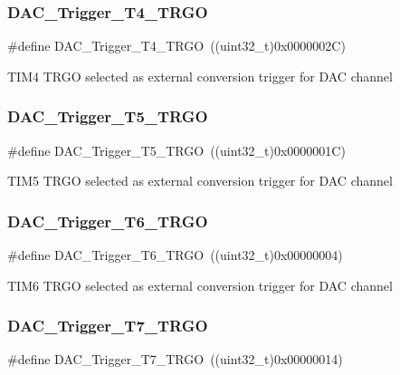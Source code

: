 \subsubsection{\texorpdfstring{DAC\_Trigger\_T4\_TRGO}{DAC\_Trigger\_T4\_TRGO}}
{\footnotesize\ttfamily \#define D\+A\+C\+\_\+\+Trigger\+\_\+\+T4\+\_\+\+T\+R\+GO~((uint32\+\_\+t)0x0000002\+C)}

T\+I\+M4 T\+R\+GO selected as external conversion trigger for D\+AC channel \mbox{\label{group___d_a_c__trigger__selection_ga35352cebfd1ae8a3d63e374a5d86a85d}} 
\subsubsection{\texorpdfstring{DAC\_Trigger\_T5\_TRGO}{DAC\_Trigger\_T5\_TRGO}}
{\footnotesize\ttfamily \#define D\+A\+C\+\_\+\+Trigger\+\_\+\+T5\+\_\+\+T\+R\+GO~((uint32\+\_\+t)0x0000001\+C)}

T\+I\+M5 T\+R\+GO selected as external conversion trigger for D\+AC channel \mbox{\label{group___d_a_c__trigger__selection_ga083307783678a2f1d3066db57dc84cfe}} 
\subsubsection{\texorpdfstring{DAC\_Trigger\_T6\_TRGO}{DAC\_Trigger\_T6\_TRGO}}
{\footnotesize\ttfamily \#define D\+A\+C\+\_\+\+Trigger\+\_\+\+T6\+\_\+\+T\+R\+GO~((uint32\+\_\+t)0x00000004)}

T\+I\+M6 T\+R\+GO selected as external conversion trigger for D\+AC channel \mbox{\label{group___d_a_c__trigger__selection_ga9b92d497746be54af46ae4e9c1fc4a6f}} 
\subsubsection{\texorpdfstring{DAC\_Trigger\_T7\_TRGO}{DAC\_Trigger\_T7\_TRGO}}
{\footnotesize\ttfamily \#define D\+A\+C\+\_\+\+Trigger\+\_\+\+T7\+\_\+\+T\+R\+GO~((uint32\+\_\+t)0x00000014)}

